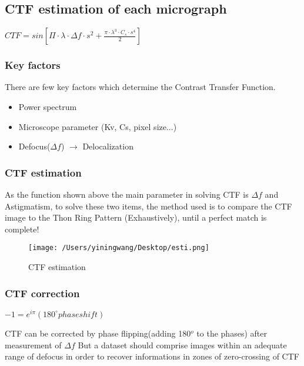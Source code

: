 \documentclass{article}
\begin{document}
    \subsection{CTF estimation of each micrograph}
    \begin{center}
        \begin{framed}
            $CTF = sin[\Pi \cdot \lambda \cdot \varDelta f \cdot s^2 + \frac{\pi \cdot 
            \lambda^3 \cdot C_s \cdot s^4}{2}]$
        \end{framed}     
    \end{center}
    \subsubsection{Key factors}
    There are few key factors which determine the Contrast Transfer Function.
    \begin{center}
         \begin{itemize}
            \item Power spectrum
            \item Microscope parameter (Kv, Cs, pixel size...)
            \item Defocus($\varDelta f$) $\longrightarrow$ Delocalization
        \end{itemize}  
    \end{center}
    \subsubsection{CTF estimation}
    As the function shown above the main parameter in solving CTF is $\varDelta f$ and
    Astigmatism, to solve these two items, the method used is to compare the CTF image to
    the Thon Ring Pattern (Exhaustively), until a perfect match is complete!
    \begin{figure}[h]
        \centering   
        \texttt{[image: /Users/yiningwang/Desktop/esti.png]} 
        \caption{\small CTF estimation}
    \end{figure}
    \subsubsection{CTF correction}
    \begin{center}
        \begin{framed}
            $-1 = e^{i\pi} (180 ^{\circ} phase shift) $
        \end{framed}     
    \end{center}
     CTF can be corrected by phase flipping(adding 180$^o$ to the phases) after measurement of $\varDelta f$
     But a dataset should comprise images within an adequate range of defocus in order to recover
     informations in zones of zero-crossing of CTF
    
\end{document}

